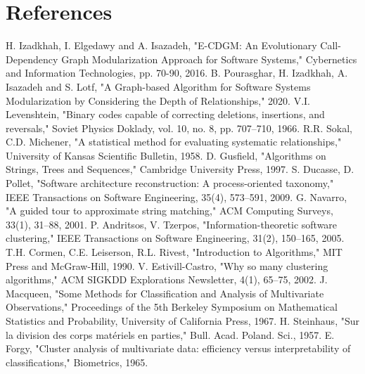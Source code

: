 \documentclass[a4paper,12pt]{article}
\begin{document}
\section{References}

\begin{thebibliography}{99}
 H. Izadkhah, I. Elgedawy and A. Isazadeh, "E-CDGM: An Evolutionary Call-Dependency Graph Modularization Approach for Software Systems," Cybernetics and Information Technologies, pp. 70-90, 2016.
 B. Pourasghar, H. Izadkhah, A. Isazadeh and S. Lotf, "A Graph-based Algorithm for Software Systems Modularization by Considering the Depth of Relationships," 2020.
 V.I. Levenshtein, "Binary codes capable of correcting deletions, insertions, and reversals," Soviet Physics Doklady, vol. 10, no. 8, pp. 707–710, 1966.
 R.R. Sokal, C.D. Michener, "A statistical method for evaluating systematic relationships," University of Kansas Scientific Bulletin, 1958.
 D. Gusfield, "Algorithms on Strings, Trees and Sequences," Cambridge University Press, 1997.
 S. Ducasse, D. Pollet, "Software architecture reconstruction: A process-oriented taxonomy," IEEE Transactions on Software Engineering, 35(4), 573–591, 2009.
 G. Navarro, "A guided tour to approximate string matching," ACM Computing Surveys, 33(1), 31–88, 2001.
 P. Andritsos, V. Tzerpos, "Information-theoretic software clustering," IEEE Transactions on Software Engineering, 31(2), 150–165, 2005.
 T.H. Cormen, C.E. Leiserson, R.L. Rivest, "Introduction to Algorithms," MIT Press and McGraw-Hill, 1990.
 V. Estivill-Castro, "Why so many clustering algorithms," ACM SIGKDD Explorations Newsletter, 4(1), 65–75, 2002.
 J. Macqueen, "Some Methods for Classification and Analysis of Multivariate Observations," Proceedings of the 5th Berkeley Symposium on Mathematical Statistics and Probability, University of California Press, 1967.
 H. Steinhaus, "Sur la division des corps matériels en parties," Bull. Acad. Poland. Sci., 1957.
 E. Forgy, "Cluster analysis of multivariate data: efficiency versus interpretability of classifications," Biometrics, 1965.
\end{thebibliography}
\end{document}
